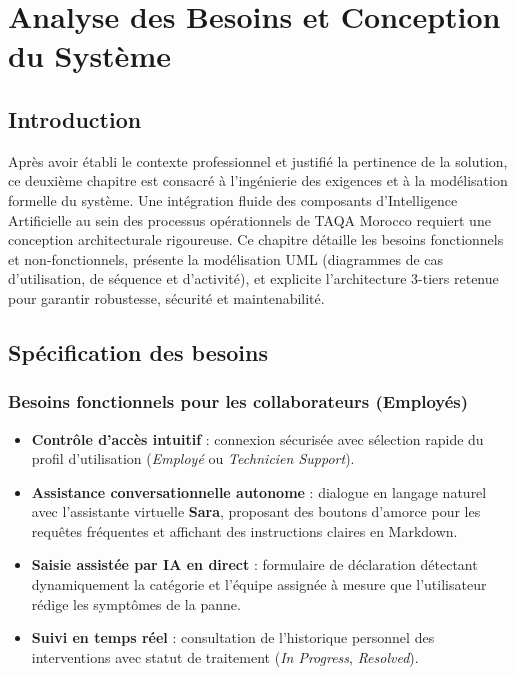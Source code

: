\documentclass[12pt, a4paper, oneside]{report}
\begin{document}
\newpage
\chapter{Analyse des Besoins et Conception du Système}

\section{Introduction}

Après avoir établi le contexte professionnel et justifié la pertinence de la solution, ce deuxième chapitre est consacré à l'ingénierie des exigences et à la modélisation formelle du système. Une intégration fluide des composants d'Intelligence Artificielle au sein des processus opérationnels de TAQA Morocco requiert une conception architecturale rigoureuse. Ce chapitre détaille les besoins fonctionnels et non-fonctionnels, présente la modélisation UML (diagrammes de cas d'utilisation, de séquence et d'activité), et explicite l'architecture 3-tiers retenue pour garantir robustesse, sécurité et maintenabilité.

\section{Spécification des besoins}

\subsection{Besoins fonctionnels pour les collaborateurs (Employés)}

\begin{itemize}
  \item \textbf{Contrôle d'accès intuitif} : connexion sécurisée avec sélection rapide du profil d'utilisation (\textit{Employé} ou \textit{Technicien Support}).
  \item \textbf{Assistance conversationnelle autonome} : dialogue en langage naturel avec l'assistante virtuelle \textbf{Sara}, proposant des boutons d'amorce pour les requêtes fréquentes et affichant des instructions claires en Markdown.
  \item \textbf{Saisie assistée par IA en direct} : formulaire de déclaration détectant dynamiquement la catégorie et l'équipe assignée à mesure que l'utilisateur rédige les symptômes de la panne.
  \item \textbf{Suivi en temps réel} : consultation de l'historique personnel des interventions avec statut de traitement (\textit{In Progress}, \textit{Resolved}).
\end{itemize}
\end{document}
